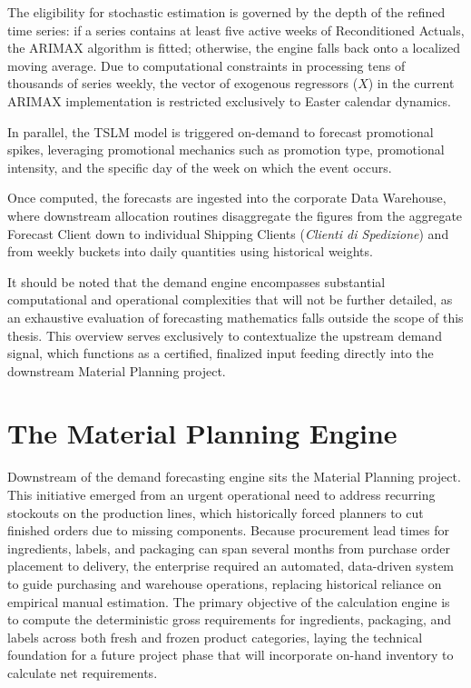 The eligibility for stochastic estimation is governed by the depth of the refined time series: if a series contains at least five active weeks of Reconditioned Actuals, 
the ARIMAX algorithm is fitted; otherwise, the engine falls back onto a localized moving average. 
Due to computational constraints in processing tens of thousands of series weekly, the vector of exogenous regressors ($X$) in the current ARIMAX 
implementation is restricted exclusively to Easter calendar dynamics. 

In parallel, the TSLM model is triggered on-demand to forecast promotional spikes, leveraging promotional mechanics such as promotion type, promotional intensity, and the specific day of the week on which the event occurs.

Once computed, the forecasts are ingested into the corporate Data Warehouse, where downstream allocation routines disaggregate the figures from the aggregate Forecast Client 
down to individual Shipping Clients (\textit{Clienti di Spedizione}) and from weekly buckets into daily quantities using historical weights. 

It should be noted that the demand engine encompasses substantial computational and operational complexities that will not be further detailed, 
as an exhaustive evaluation of forecasting mathematics falls outside the scope of this thesis. 
This overview serves exclusively to contextualize the upstream demand signal, which functions as a certified, finalized input feeding directly 
into the downstream Material Planning project.


\section{The Material Planning Engine}

Downstream of the demand forecasting engine sits the Material Planning project. 
This initiative emerged from an urgent operational need to address recurring stockouts on the production lines, which historically forced planners to cut 
finished orders due to missing components. 
Because procurement lead times for ingredients, labels, and packaging can span several months from purchase order placement to delivery, 
the enterprise required an automated, data-driven system to guide purchasing and warehouse operations, replacing historical reliance on empirical manual estimation. 
The primary objective of the calculation engine is to compute the deterministic gross requirements for ingredients, packaging, and labels across both fresh and frozen product categories, 
laying the technical foundation for a future project phase that will incorporate on-hand inventory to calculate net requirements.

